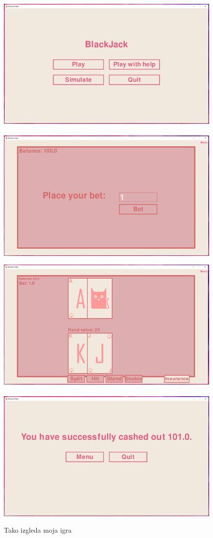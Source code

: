 \documentclass[a4paper, 16pt]{article}
\begin{document}
\begin{figure}[htbp]
\centering
{}
\includegraphics{meni.png}\,%
\includegraphics{bet.png}
  
\includegraphics{table.png}\,%
\includegraphics{cash_out.png}
\caption{Tako izgleda moja igra}
\end{figure}
\end{document}

